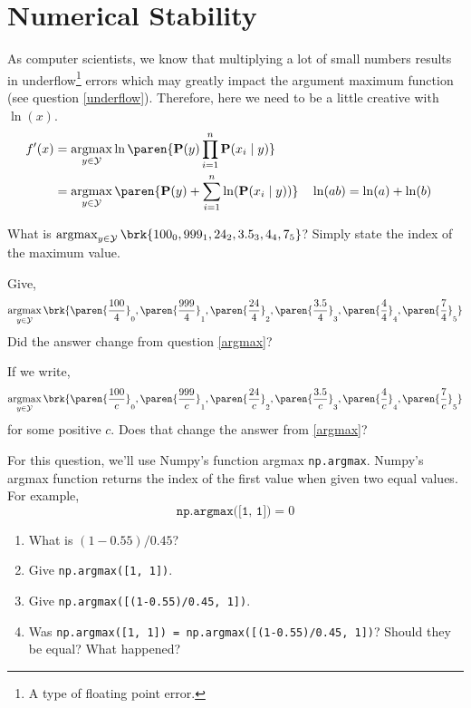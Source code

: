 \documentclass{homework}
\renewcommand\P{\mathbf{P}}
\newcommand\Y{\mathcal{Y}}
\DeclareMathOperator*{\argmax}{argmax}
\begin{document}
\section{Numerical Stability}
As computer scientists, we know that multiplying a lot of small numbers results in underflow\footnote{A type of floating point error.} errors which may greatly impact the argument maximum function (see question \ref{underflow}). Therefore, here we need to be a little creative with $\ln(x)$.
\begin{align*}
  f'(x) & = \argmax_{y\in \Y}\ln\paren{\P(y)\prod_{i=1}^n\P(x_i \mid y)}                                    \\
        & = \argmax_{y\in \Y}\paren{\P(y) + \sum_{i=1}^n\ln(\P(x_i \mid y))} &  & \ln(ab) = \ln(a) + \ln(b) \\
\end{align*}

\question\label{argmax} What is $\argmax_{y\in \Y} \brk{100_0, 999_1, 24_2, 3.5_3, 4_4, 7_5}$? Simply state the index of the maximum value.

\question\label{argmax1} Give,
\[
  \argmax_{y\in \Y} \brk{\paren{\frac{100}{4}}_0, \paren{\frac{999}{4}}_1, \paren{\frac{24}{4}}_2, \paren{\frac{3.5}{4}}_3, \paren{\frac{4}{4}}_4, \paren{\frac{7}{4}}_5}
\]
Did the answer change from question \ref{argmax}?

\question\label{argmax2} If we write,
\[
  \argmax_{y\in \Y} \brk{\paren{\frac{100}{c}}_0, \paren{\frac{999}{c}}_1, \paren{\frac{24}{c}}_2, \paren{\frac{3.5}{c}}_3, \paren{\frac{4}{c}}_4, \paren{\frac{7}{c}}_5}
\]
for some positive $c$. Does that change the answer from \ref{argmax}?

\question\label{underflow} For this question, we'll use Numpy's function argmax \eg \texttt{np.argmax}. Numpy's argmax function returns the index of the first value when given two equal values. For example,
\[
  \texttt{np.argmax([1, 1])} = 0
\]
\begin{enumerate}
  \item What is $(1-0.55)/0.45$?
  \item Give \texttt{np.argmax([1, 1])}.
  \item Give \texttt{np.argmax([(1-0.55)/0.45, 1])}.
  \item Was \texttt{np.argmax([1, 1]) = np.argmax([(1-0.55)/0.45, 1])}? Should they be equal? What happened?
\end{enumerate}
\end{document}
